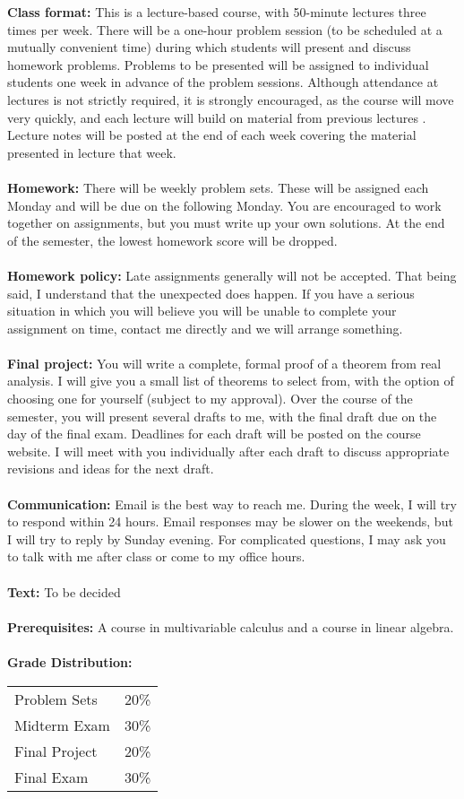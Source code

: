 \documentclass[11pt]{article}
\begin{document}
\textbf {Class format:} This is a lecture-based course, with 50-minute lectures three times per week. There will be a one-hour problem session (to be scheduled at a mutually convenient time) during which students will present and discuss homework problems. Problems to be presented will be assigned to individual students one week in advance of the problem sessions. Although attendance at lectures is not strictly required, it is strongly encouraged, as the course will move very quickly, and each lecture will build on material from previous lectures . Lecture notes will be posted at the end of each week covering the material presented in lecture that week.
\\\\
\textbf {Homework: }There will be weekly problem sets. These will be assigned each Monday and will be due on the following Monday. You are encouraged to work together on assignments, but you must write up your own solutions. At the end of the semester, the lowest homework score will be dropped. \\\\
\textbf{Homework policy: }Late assignments generally will not be accepted. That being said, I understand that the unexpected does happen. If you have a serious situation in which you will believe you will be unable to complete your assignment on time, contact me directly and we will arrange something.\\\\
\textbf{Final project: }You will write a complete, formal proof of a theorem from real analysis. I will give you a small list of theorems to select from, with the option of choosing one for yourself (subject to my approval). Over the course of the semester, you will present several drafts to me, with the final draft due on the day of the final exam. Deadlines for each draft will be posted on the course website. I will meet with you individually after each draft to discuss appropriate revisions and ideas for the next draft.\\\\
\textbf{Communication: }Email is the best way to reach me. During the week, I will try to respond within 24 hours. Email responses may be slower on the weekends, but I will try to reply by Sunday evening. For complicated questions, I may ask you to talk with me after class or come to my office hours.
\\\\
\textbf {\large Text:} To be decided \\\\
\textbf {Prerequisites:} A course in multivariable calculus and a course in linear algebra. \\\\
\textbf {Grade Distribution:} \\
\hspace*{40mm}
\begin{tabular}{ l l }
Problem Sets & 20\% \\
Midterm Exam  & 30\% \\
Final Project & 20\% \\
Final Exam  & 30\%
\end{tabular} \\\\
\end{document}
